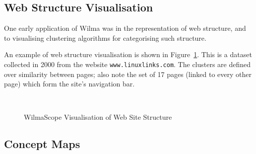 \documentclass[runningheads]{cl2emult}
\newcommand{\url}[1]{{\small{\tt #1}}}
\begin{document}
\subsection{Web Structure Visualisation}

One early application of Wilma was in the representation of web structure, and
to visualising clustering algorithms for categorising such
structure\cite{eckersley2kclassiscope}.

An example of web structure visualisation is shown in Figure~\ref{fig-web}.
This is a dataset collected in 2000 from the website \url{www.linuxlinks.com}.
The clusters are defined over similarity between pages; also note the set of
17 pages (linked to every other page) which form the site's navigation bar.

\begin{figure}
\begin{center}
 \\
\caption{WilmaScope Visualisation of Web Site Structure}
\label{fig-web}
\end{center}
\end{figure}

\subsection{Concept Maps}
\end{document}
